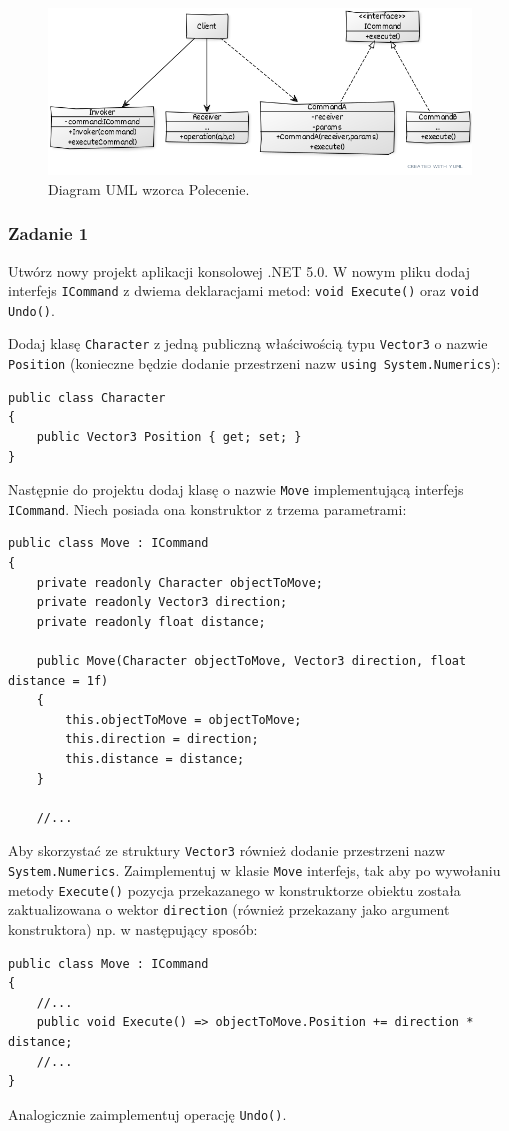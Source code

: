 \begin{figure}[hbt!]
	\centering
	\includegraphics[width=0.9\linewidth]{images/CommandUml}
	\caption{Diagram UML wzorca Polecenie.}
	\label{lab4/fig/CommandUml}
\end{figure}
%

\subsubsection{Zadanie 1}
Utwórz nowy projekt aplikacji konsolowej .NET 5.0. W nowym pliku dodaj interfejs \texttt{ICommand} z dwiema deklaracjami metod: \texttt{void Execute()} oraz \texttt{void Undo()}.

Dodaj klasę \texttt{Character} z jedną publiczną właściwością typu \texttt{Vector3} o nazwie \texttt{Position} (konieczne będzie dodanie przestrzeni nazw \texttt{using System.Numerics}):
\begin{lstlisting}
public class Character
{
	public Vector3 Position { get; set; }
}
\end{lstlisting}

Następnie do projektu dodaj klasę o nazwie \texttt{Move} implementującą interfejs \texttt{ICommand}. Niech posiada ona konstruktor z trzema parametrami:
\begin{lstlisting}
public class Move : ICommand
{
	private readonly Character objectToMove;
	private readonly Vector3 direction;
	private readonly float distance;
	
	public Move(Character objectToMove, Vector3 direction, float distance = 1f)
	{
		this.objectToMove = objectToMove;
		this.direction = direction;
		this.distance = distance;
	}

	//...
\end{lstlisting}
Aby skorzystać ze struktury \texttt{Vector3} również dodanie przestrzeni nazw \texttt{System.Numerics}. Zaimplementuj w klasie \texttt{Move} interfejs, tak aby po wywołaniu metody \texttt{Execute()} pozycja przekazanego w konstruktorze obiektu została zaktualizowana o wektor \texttt{direction} (również przekazany jako argument konstruktora) np. w następujący sposób:
\begin{lstlisting}
public class Move : ICommand
{
	//...	
	public void Execute() => objectToMove.Position += direction * distance;
	//...
}
\end{lstlisting}
Analogicznie zaimplementuj operację \texttt{Undo()}.

